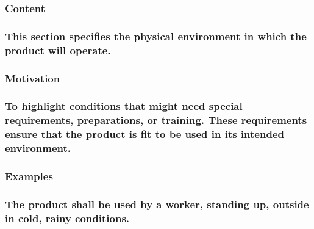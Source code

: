 \documentclass[
]{article}
\begin{document}
\hypertarget{content-45}{%
\subsubsection{Content}\label{content-45}}

\hypertarget{this-section-specifies-the-physical-environment-in-which-the-product-will-operate.}{%
\subsubsection{\texorpdfstring{This section specifies the physical
environment in which the product will operate.
}{This section specifies the physical environment in which the product will operate. }}\label{this-section-specifies-the-physical-environment-in-which-the-product-will-operate.}}

\hypertarget{motivation-44}{%
\subsubsection{Motivation}\label{motivation-44}}

\hypertarget{to-highlight-conditions-that-might-need-special-requirements-preparations-or-training.-these-requirements-ensure-that-the-product-is-fit-to-be-used-in-its-intended-environment.}{%
\subsubsection{\texorpdfstring{To highlight conditions that might need
special requirements, preparations, or training. These requirements
ensure that the product is fit to be used in its intended environment.
}{To highlight conditions that might need special requirements, preparations, or training. These requirements ensure that the product is fit to be used in its intended environment. }}\label{to-highlight-conditions-that-might-need-special-requirements-preparations-or-training.-these-requirements-ensure-that-the-product-is-fit-to-be-used-in-its-intended-environment.}}

\hypertarget{examples-29}{%
\subsubsection{Examples}\label{examples-29}}

\hypertarget{the-product-shall-be-used-by-a-worker-standing-up-outside-in-cold-rainy-conditions.}{%
\subsubsection{The product shall be used by a worker, standing up,
outside in cold, rainy
conditions.}\label{the-product-shall-be-used-by-a-worker-standing-up-outside-in-cold-rainy-conditions.}}
\end{document}
